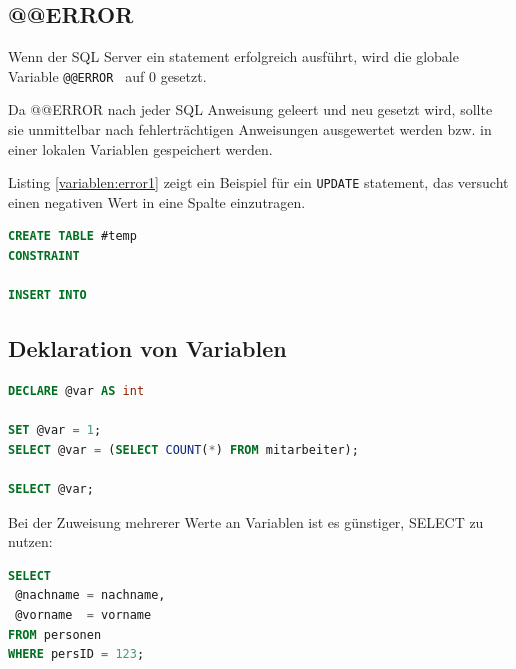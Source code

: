 \documentclass[12pt,ngerman,a4paper,index=totoc,twoside]{scrartcl}
\newcommand{\sql}[1]{\texttt{#1}}
\newcommand{\lwidth}{0.75}
\begin{document}
\subsection{@@ERROR} 

Wenn der SQL Server ein statement erfolgreich ausführt, wird die globale Variable \sql{@@ERROR } auf $0$ gesetzt.

Da @@ERROR nach jeder SQL Anweisung geleert und neu gesetzt wird, sollte sie unmittelbar nach fehlerträchtigen Anweisungen ausgewertet werden bzw. in einer lokalen Variablen gespeichert werden. 

Listing \ref{variablen:error1} zeigt ein Beispiel für ein \sql{UPDATE} statement, das versucht einen negativen Wert in eine Spalte einzutragen.
 
\begin{center}
\begin{minipage}{\lwidth\textwidth}
\begin{lstlisting}[language={SQL},caption={Beispiel für \sql{@@ERROR}},label={variablen:error1}]
CREATE TABLE #temp
CONSTRAINT

INSERT INTO 


\end{lstlisting}
\end{minipage}
\end{center}

\subsection{Deklaration von Variablen}

\begin{center}
\begin{minipage}{\lwidth\textwidth}
\begin{lstlisting}[language={SQL},caption={Beispiel für benutzerdefinierte Variablen},label={variablen:ex1}]
DECLARE @var AS int

SET @var = 1;
SELECT @var = (SELECT COUNT(*) FROM mitarbeiter);

SELECT @var;
\end{lstlisting}
\end{minipage}
\end{center}

Bei der Zuweisung mehrerer Werte an Variablen ist es günstiger, SELECT zu nutzen:

\begin{center}
\begin{minipage}{\lwidth\textwidth}
\begin{lstlisting}[language={SQL},caption={Beispiel für benutzerdefinierte Variablen},label={variablen:ex2}]
SELECT
 @nachname = nachname,
 @vorname  = vorname
FROM personen
WHERE persID = 123;
\end{lstlisting}
\end{minipage}
\end{center}
\end{document}
